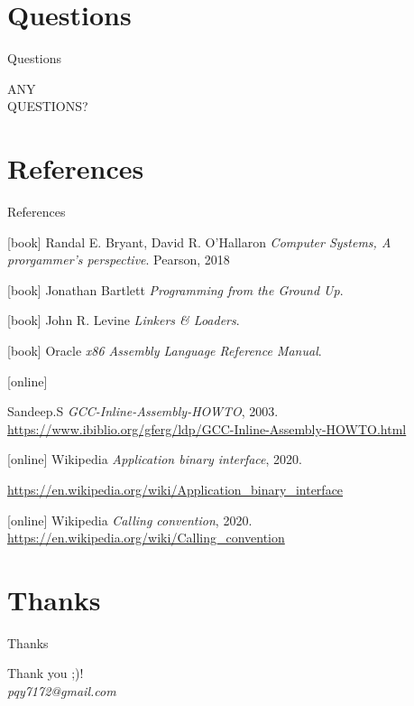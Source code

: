 \documentclass[UKenglish]{beamer}
\begin{document}
\section{Questions}
\begin{frame}{Questions}
  \begin{center}
    \vspace{1.5cm}
    \Huge ANY\\
    \Huge QUESTIONS?\\
  \end{center}
\end{frame}


\section{References}
\begin{frame}[allowframebreaks]{References}
    \begin{thebibliography}{}

        [book]
         Randal E. Bryant, David R. O'Hallaron
        \newblock \emph{Computer Systems, A prorgammer's perspective}.
        \newblock Pearson, 2018
   

      [book]
          Jonathan Bartlett
        \newblock \emph{Programming from the Ground Up}.

        [book]
          John R. Levine
        \newblock \emph{Linkers \& Loaders}.

        [book]
         Oracle
        \newblock \emph{x86 Assembly Language Reference Manual}.
        
        [online]
        
          Sandeep.S
        \newblock \emph{GCC-Inline-Assembly-HOWTO}, 2003.
        \newblock \url{https://www.ibiblio.org/gferg/ldp/GCC-Inline-Assembly-HOWTO.html}

        [online]
        Wikipedia
        \newblock \emph{Application binary interface}, 2020.
        
        \newblock \url{https://en.wikipedia.org/wiki/Application_binary_interface}

        [online]
        Wikipedia
        \newblock \emph{Calling convention}, 2020.
        \newblock \url{https://en.wikipedia.org/wiki/Calling_convention}
      \end{thebibliography}
    \end{frame}
    
 \section{Thanks}

 \begin{frame}{Thanks}
   \begin{center}
     \vspace{2cm}
     \Huge Thank you ;)!\\
     
     \emph{pqy7172@gmail.com}
   \end{center}
 \end{frame}
\end{document}
